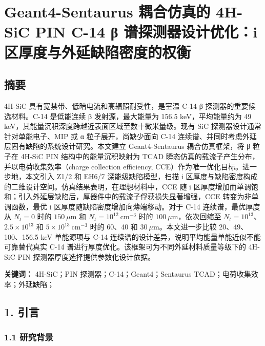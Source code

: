 \documentclass[
  10pt,
  a4paper,
]{ctexart}
\author{}
\date{}
\begin{document}
\section{Geant4-Sentaurus 耦合仿真的 4H-SiC PIN C-14 β
谱探测器设计优化：i
区厚度与外延缺陷密度的权衡}\label{geant4-sentaurus-ux8026ux5408ux4effux771fux7684-4h-sic-pin-c-14-ux3b2-ux8c31ux63a2ux6d4bux5668ux8bbeux8ba1ux4f18ux5316i-ux533aux539aux5ea6ux4e0eux5916ux5ef6ux7f3aux9677ux5bc6ux5ea6ux7684ux6743ux8861}

\subsection{摘要}\label{ux6458ux8981}

4H-SiC 具有宽禁带、低暗电流和高辐照耐受性，是室温 C-14 β
探测器的重要候选材料。C-14 是低能连续 β 发射源，最大能量为 156.5
keV，平均能量约为 49
keV，其能量沉积深度跨越近表面区域至数十微米量级。现有 SiC
探测器设计通常针对单能电子、MIP 或 α 粒子展开，尚缺少面向 C-14
连续谱、并同时考虑外延层固有缺陷的系统设计研究。本文建立
Geant4-Sentaurus 耦合仿真框架，将 β 粒子在 4H-SiC PIN
结构中的能量沉积映射为 TCAD
瞬态仿真的载流子产生分布，并以电荷收集效率（charge collection
efficiency, CCE）作为唯一优化目标。进一步地，本文引入 Z1/2 和 EH6/7
深能级缺陷模型，扫描 i
区厚度与缺陷密度构成的二维设计空间。仿真结果表明，在理想材料中，CCE 随 i
区厚度增加而单调饱和；引入外延层缺陷后，厚器件中的载流子俘获损失显著增强，CCE
转变为非单调函数，最优 i 区厚度随缺陷密度增加向薄端移动。对于 C-14
连续谱，最优厚度从 \(N_t=0\) 时的 \(150\ \mu\mathrm{m}\) 和
\(N_t=10^{12}\ \mathrm{cm^{-3}}\) 时的
\(100\ \mu\mathrm{m}\)，依次回缩至 \(N_t=10^{13}\)、\(2.5\times10^{13}\)
和 \(5\times10^{13}\ \mathrm{cm^{-3}}\) 时的 60、40 和
\(30\ \mu\mathrm{m}\)。本文进一步比较 20、49、100、156.5 keV 单能源项与
C-14 连续谱的设计差异，说明平均能量单能近似不能可靠替代真实 C-14
谱进行厚度优化。该框架可为不同外延材料质量等级下的 4H-SiC PIN
探测器厚度选择提供参数化设计依据。

\textbf{关键词：} 4H-SiC；PIN 探测器；C-14；Geant4；Sentaurus
TCAD；电荷收集效率；外延缺陷；

\subsection{1. 引言}\label{ux5f15ux8a00}

\subsubsection{1.1 研究背景}\label{ux7814ux7a76ux80ccux666f}
\end{document}
